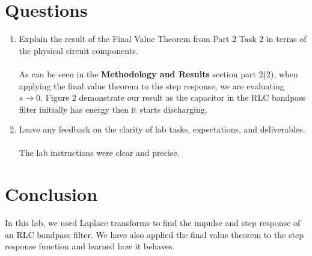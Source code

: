 \documentclass[12pt,a4paper]{article}
\begin{document}
\section{Questions}\label{sec:res}
\begin{enumerate}
    
    \item
    Explain the result of the Final Value Theorem from Part 2 Task 2 in terms of the physical
    circuit components.\\
    \\As can be seen in the \textbf{Methodology and Results} section part 2(2), when applying the final value theorem to the step response, we are evaluating $s \to 0$. Figure 2 demonstrate our result as the capacitor in the RLC bandpass filter initially has energy then it starts discharging.\\

    \item
    Leave any feedback on the clarity of lab tasks, expectations, and deliverables.\\
    \\The lab instructions were clear and precise. 
\end{enumerate}
\section{Conclusion}\label{sec:res}
    In this lab, we used Laplace transforms to find the impulse and step response of an RLC bandpass filter. We have also applied the final value theorem to the step response function and learned how it behaves. 


\end{document}
